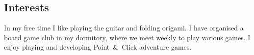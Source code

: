 \documentclass[a4paper, 12pt, draft]{article}
\begin{document}
\vspace{-5mm}
\subsection*{Interests}
In my free time I like playing the guitar and folding origami. I have organised a board game club in my dormitory, where we meet weekly to play various games. I enjoy playing and developing \mbox{Point \& Click} adventure games.
\end{document}
